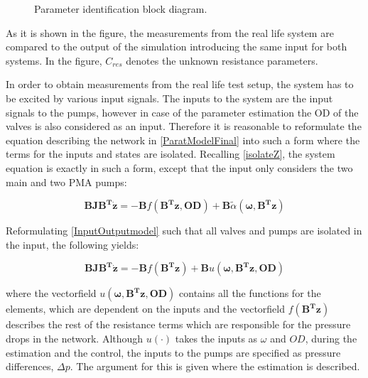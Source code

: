 \begin{figure}[H]
\centering
 
\caption{Parameter identification block diagram. }
\label{fig:parame_block}
\end{figure}

As it is shown in the figure, the measurements from the real life system are compared to the output of the simulation introducing the same input for both systems. In the figure, $C_{res}$ denotes the unknown resistance parameters.

In order to obtain measurements from the real life test setup, the system has to be excited by various input signals. The inputs to the system are the input signals to the pumps, however in case of the parameter estimation the OD of the valves is also considered as an input. Therefore it is reasonable to reformulate the equation describing the network in \eqref{ParatModelFinal} into such a form where the terms for the inputs and states are isolated. Recalling \eqref{isolateZ}, the system equation is exactly in such a form, except that the input only considers the two main and two PMA pumps: 

\begin{equation}
\bm{B} \bm{J} \bm{B^T} \bm{\dot{z}} = - \bm{B} f(\bm{B^T}\bm{z}, \bm{OD}) + \bm{B}\tilde{\alpha} (\bm{\omega},\bm{B^T}\bm{z}) 
 \label{InputOutputmodel}
\end{equation}

Reformulating \eqref{InputOutputmodel} such that all valves and pumps are isolated in the input, the following yields:

\begin{equation}
\bm{B} \bm{J} \bm{B^T} \bm{\dot{z}} = - \bm{B} f(\bm{B^T}\bm{z}) + \bm{B} u(\bm{\omega},\bm{B^T}\bm{z},\bm{OD}) 
 \label{InputOutputmodel2}
\end{equation}

where the vectorfield $u(\bm{\omega},\bm{B^T}\bm{z},\bm{OD})$ contains all the functions for the elements, which are dependent on the inputs and the vectorfield $f(\bm{B^T}\bm{z})$ describes the rest of the resistance terms which are responsible for the pressure drops in the network. Although $u(\cdot)$ takes the inputs as $\omega$ and $OD$, during the estimation and the control, the inputs to the pumps are specified as pressure differences, $\Delta p$. The argument for this is given where the estimation is described.

